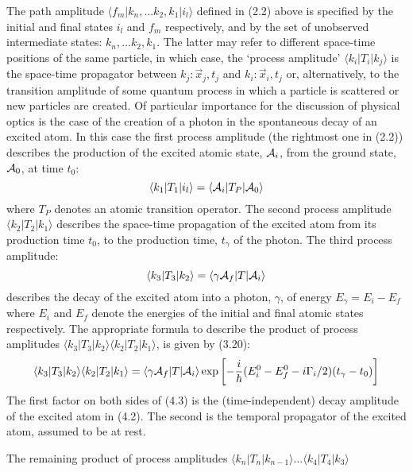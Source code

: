 { \par  The path amplitude $\langle f_m|k_n,...k_2,k_1|i_l \rangle$ defined in (2.2)
  above  is specified by the initial and final states
  $i_l$ and $f_m$ respectively, and by the set of unobserved intermediate states: $k_n,...k_2,k_1$.
   The latter may refer to different space-time positions of the same particle, in which case,
   the `process amplitude'
    $ \langle k_i|T_i|k_j\rangle$ is the space-time propagator between $k_j: \vec{x}_j , t_j$ and
   $k_i: \vec{x}_i , t_j$ or, alternatively, to the transition amplitude of some quantum
   process in which a particle is scattered or new particles are created. Of particular importance
   for the discussion of physical optics is the case of the creation of a photon in the spontaneous
  decay of an excited atom.  In this case 
  the first process amplitude (the rightmost one in (2.2)) describes the production of the
  excited atomic state, ${\cal A}_i$, from the ground state, ${\cal A}_0$, at time $t_0$:
  \begin{equation}
   \langle k_1|T_1|i_l\rangle =  \langle {\cal A}_i|T_P| {\cal A}_0 \rangle
 \end{equation} 
 where $T_P$ denotes an atomic transition operator. The second process amplitude  $\langle k_2|T_2|k_1\rangle$  
 describes the space-time propagation of the excited atom from its production time $t_0$, to the production time,
  $t_{\gamma}$ of the photon.
  The third process amplitude:
   \begin{equation}
   \langle k_3|T_3|k_2\rangle = \langle \gamma  {\cal A}_f|T| {\cal A}_i\rangle   
 \end{equation} 
  describes the decay of the excited atom into a photon, $ \gamma$, of energy 
  $E_{\gamma} = E_i-E_f$ where $E_i$ and $E_f$ denote the energies of the initial and final
  atomic states respectively. The appropriate formula to describe the product of process
  amplitudes  $\langle k_3|T_3|k_2\rangle\langle k_2|T_2|k_1\rangle$, is given by (3.20):
    \begin{equation}
\langle k_3|T_3|k_2\rangle\langle k_2|T_2|k_1\rangle =  \langle \gamma  {\cal A}_f|T| {\cal A}_i\rangle
   \exp\left[ -\frac{i}{\hbar}(E_i^0-E_f^0-i\Gamma_i/2)(t_{\gamma}-t_0)\right]
  \end{equation} 
    The first factor on both sides of (4.3) is the (time-independent) decay amplitude of the excited
   atom  in (4.2). The second is the temporal propagator of the excited atom, assumed to be
   at rest.
  \par The remaining product of process amplitudes $\langle k_{n}|T_n|k_{n-1}\rangle...\langle k_4|T_4|k_3\rangle$
}

